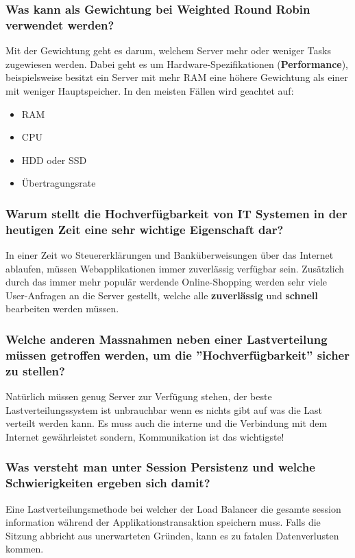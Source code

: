 \subsubsection{Was kann als Gewichtung bei Weighted Round Robin verwendet werden?}
Mit der Gewichtung geht es darum, welchem Server mehr oder weniger Tasks zugewiesen werden. Dabei geht es um Hardware-Spezifikationen (\textbf{Performance}), beispielsweise besitzt ein Server mit mehr RAM eine höhere Gewichtung als einer mit weniger Hauptspeicher.
In den meisten Fällen wird geachtet auf:

\begin{itemize}
	\item RAM
	\item CPU
	\item HDD oder SSD
	\item Übertragungsrate
\end{itemize}

\subsubsection{Warum stellt die Hochverfügbarkeit von IT Systemen in der heutigen Zeit eine sehr wichtige Eigenschaft dar?}
In einer Zeit wo Steuererklärungen und Banküberweisungen über das Internet ablaufen, müssen Webapplikationen immer zuverlässig verfügbar sein. Zusätzlich durch das immer mehr populär werdende Online-Shopping werden sehr viele User-Anfragen an die Server gestellt, welche alle \textbf{zuverlässig} und \textbf{schnell} bearbeiten werden müssen.
\subsubsection{Welche anderen Massnahmen neben einer Lastverteilung müssen getroffen werden, um die ''Hochverfügbarkeit'' sicher zu stellen?}
Natürlich müssen genug Server zur Verfügung stehen, der beste Lastverteilungssystem ist unbrauchbar wenn es nichts gibt auf was die Last verteilt werden kann. Es muss auch die interne und die Verbindung mit dem Internet gewährleistet sondern, Kommunikation ist das wichtigste!
\subsubsection{Was versteht man unter Session Persistenz und welche Schwierigkeiten ergeben sich damit?}
Eine Lastverteilungsmethode bei welcher der Load Balancer die gesamte session information während der Applikationstransaktion speichern muss. Falls die Sitzung abbricht aus unerwarteten Gründen, kann es zu fatalen Datenverlusten kommen.
